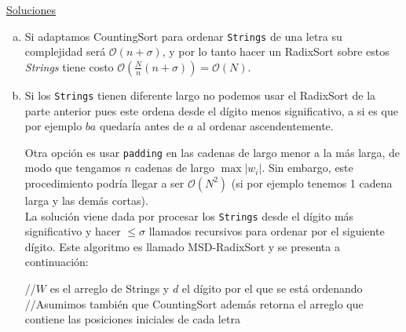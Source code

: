 \documentclass[dcc,uchile]{fcfmcourse}
\theoremstyle{plain}
\theoremstyle{definition}
\begin{document}
\newpage
\begin{center}
{\huge \underline{Soluciones}}
\end{center}
\begin{problems}
\item
\begin{enumerate}[a)]
    \item Si adaptamos CountingSort para ordenar \texttt{Strings} de una letra su complejidad será $\mathcal{O}(n + \sigma)$, y por lo tanto hacer un RadixSort sobre estos \textit{Strings} tiene costo $\mathcal{O}\left(\frac{N}{n} (n + \sigma)\right) = \mathcal{O}(N)$.\\
    
    \item Si los \texttt{Strings} tienen diferente largo no podemos usar el RadixSort de la parte anterior pues este ordena desde el dígito menos significativo, a si es que por ejemplo $ba$ quedaría antes de $a$ al ordenar ascendentemente.
    
    Otra opción es usar \texttt{padding} en las cadenas de largo menor a la más larga, de modo que tengamos $n$ cadenas de largo $\max{|w_{i}|}$. Sin embargo, este procedimiento podría llegar a ser $\mathcal{O}(N^2)$ (si por ejemplo tenemos 1 cadena larga y las demás cortas). \crying\\
    
    La solución viene dada por procesar los \texttt{Strings} desde el dígito más significativo y hacer $\le \sigma$ llamados recursivos para ordenar por el siguiente dígito. Este algoritmo es llamado MSD-RadixSort y se presenta a continuación:
    
    \begin{algorithm}[H]
        \SetAlgoLined
        //$W$ es el arreglo de Strings y $d$ el dígito por el que se está ordenando\\
        //Asumimos también que CountingSort además retorna el arreglo que contiene las posiciones iniciales de cada letra\\
\end{algorithm}
\end{enumerate}
\end{problems}
\end{document}

